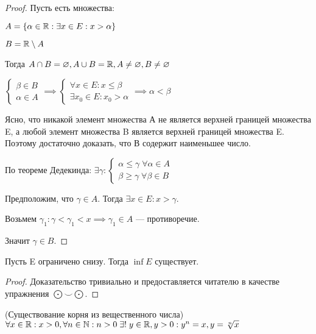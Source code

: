 \begin{proof}
    Пусть есть множества:
    
    $A = \{\alpha \in \mathbb{R}: \exists x \in E: x > \alpha\}$

    $B = \mathbb{R} \setminus A$

    Тогда $A \cap B = \varnothing, A \cup B = \mathbb{R}, A \neq \varnothing, B \neq \varnothing$

    $\begin{cases}
        \beta \in B \\
        \alpha \in A
    \end{cases} \implies \begin{cases}
        \forall x \in E: x \leq \beta\\
        \exists x_0 \in E: x_0 > \alpha
    \end{cases} \implies \alpha < \beta$

    Ясно, что никакой элемент множества А не является верхней границей множества E, а любой элемент множества B является верхней границей множества E. Поэтому достаточно доказать, что В содержит наименьшее число.
    
    По теореме Дедекинда: $\exists \gamma: \begin{cases}
        \alpha \leq \gamma \; \forall \alpha \in A\\
        \beta \geq \gamma \; \forall \beta \in B
    \end{cases}$

    Предположим, что $\gamma \in A$. Тогда $\exists x \in E: x > \gamma$.
    
    Возьмем $\gamma_1: \gamma < \gamma_1 < x \implies \gamma_1 \in A$ --- противоречие. 
    
    Значит $\gamma \in B$.
\end{proof}

\begin{theorem}
    Пусть E ограничено снизу. Тогда $\inf E$ существует.
\end{theorem}

\begin{proof}
    Доказательство тривиально и предоставляется читателю в качестве упражнения $\bigodot \smile \bigodot$.
\end{proof}

\begin{theorem} (Существование корня из вещественного числа)
    $\forall x \in \mathbb{R}: x > 0, \forall n \in \mathbb{N}: n > 0 \; \exists! \; y \in \mathbb{R}, y > 0: y^n = x, y = \sqrt[n]{x}$
\end{theorem}

